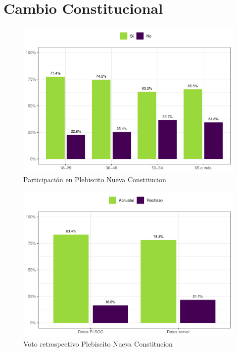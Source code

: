 \documentclass[
  12pt,
  openany]{book}
\begin{document}
\hypertarget{cambio-constitucional}{%
\chapter{Cambio Constitucional}\label{cambio-constitucional}}

\begin{figure}

{\centering \includegraphics{reporte-elsoc_files/figure-latex/particip-edad-1} 

}

\caption{Participación en Plebiscito Nueva Constitucion}\label{fig:particip-edad}
\end{figure}

\begin{figure}

{\centering \includegraphics{reporte-elsoc_files/figure-latex/servel-apruebo-1} 

}

\caption{Voto retrospectivo Plebiscito Nueva Constitucion}\label{fig:servel-apruebo}
\end{figure}
\end{document}

